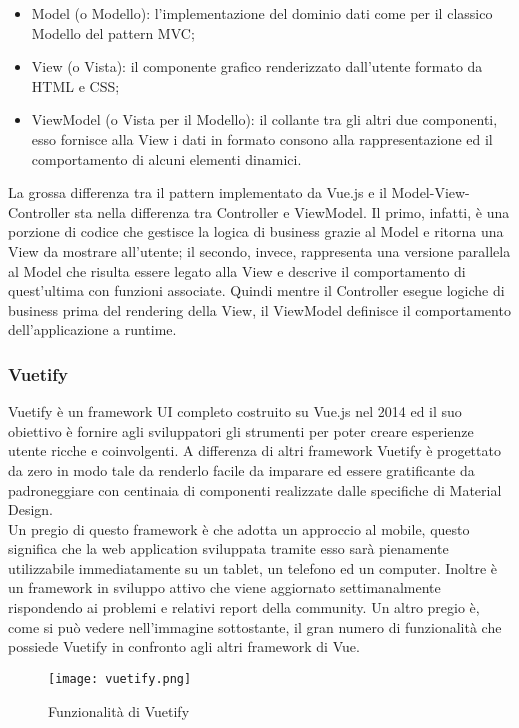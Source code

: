 \begin{itemize}
	\item Model (o Modello): l'implementazione del dominio dati come per il classico Modello del pattern MVC;
	\item View (o Vista): il componente grafico renderizzato dall'utente formato da HTML e CSS;
	\item ViewModel (o Vista per il Modello): il collante tra gli altri due componenti, esso fornisce alla View i dati in formato consono alla rappresentazione ed il comportamento di alcuni elementi dinamici.
\end{itemize}
La grossa differenza tra il pattern implementato da Vue.js e il Model-View-Controller sta nella differenza tra Controller e ViewModel. Il primo, infatti, è una porzione di codice che gestisce la logica di business grazie al Model e ritorna una View da mostrare all'utente; il secondo, invece, rappresenta una versione parallela al Model che risulta essere legato alla View e descrive il comportamento di quest'ultima con funzioni associate. Quindi mentre il Controller esegue logiche di business prima del rendering della View, il ViewModel definisce il comportamento dell'applicazione a runtime.

\subsubsection{Vuetify}
\label{subsubsec:vuetify}

Vuetify è un framework UI completo costruito su Vue.js nel 2014 ed il suo obiettivo è fornire agli sviluppatori gli strumenti per poter creare esperienze utente ricche e coinvolgenti. A differenza di altri framework Vuetify è progettato da zero in modo tale da renderlo facile da imparare ed essere gratificante da padroneggiare con centinaia di componenti realizzate dalle specifiche di Material Design.\\
Un pregio di questo framework è che adotta un approccio al mobile, questo significa che la web application sviluppata tramite esso sarà pienamente utilizzabile immediatamente su un tablet, un telefono ed un computer. Inoltre è un framework in sviluppo attivo che viene aggiornato settimanalmente rispondendo ai problemi e relativi report della community. Un altro pregio è, come si può vedere nell'immagine sottostante, il gran numero di funzionalità che possiede Vuetify in confronto agli altri framework di Vue.
\begin{figure}[H]
	\begin{center}
		\texttt{[image: vuetify.png]}
		\caption{Funzionalità di Vuetify}
	\end{center}
\end{figure}

